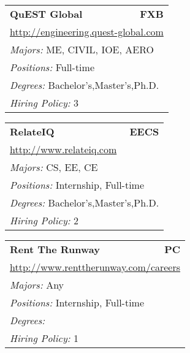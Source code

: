 \documentclass[twoside]{article}
\begin{document}
\begin{center}
\begin{multicols}{3}
\begin{FlushLeft}
\begin{minipage}{.9\columnwidth}
\end{minipage}
 
\begin{minipage}{.9\columnwidth}\begin{tabularx}{.95\columnwidth}{Xr}
                 {\Large\bf QuEST Global} & {\Large\bf FXB}\\
    \multicolumn{2}{p{.95\columnwidth}}{\url{http://engineering.quest-global.com}}\\
    \multicolumn{2}{p{.95\columnwidth}}{\emph{Majors:} ME, CIVIL, IOE, AERO}\\
    \multicolumn{2}{p{.95\columnwidth}}{\emph{Positions:} Full-time}\\
    \multicolumn{2}{p{.95\columnwidth}}{\emph{Degrees:} Bachelor's,Master's,Ph.D.}\\
    \multicolumn{2}{p{.95\columnwidth}}{\emph{Hiring Policy:} 3}\\
    \end{tabularx}
    
\end{minipage}
 
\begin{minipage}{.9\columnwidth}\begin{tabularx}{.95\columnwidth}{Xr}
                 {\Large\bf RelateIQ} & {\Large\bf EECS}\\
    \multicolumn{2}{p{.95\columnwidth}}{\url{http://www.relateiq.com}}\\
    \multicolumn{2}{p{.95\columnwidth}}{\emph{Majors:} CS, EE, CE}\\
    \multicolumn{2}{p{.95\columnwidth}}{\emph{Positions:} Internship, Full-time}\\
    \multicolumn{2}{p{.95\columnwidth}}{\emph{Degrees:} Bachelor's,Master's,Ph.D.}\\
    \multicolumn{2}{p{.95\columnwidth}}{\emph{Hiring Policy:} 2}\\
    \end{tabularx}
    
\end{minipage}
 
\begin{minipage}{.9\columnwidth}\begin{tabularx}{.95\columnwidth}{Xr}
                 {\Large\bf Rent The Runway} & {\Large\bf PC}\\
    \multicolumn{2}{p{.95\columnwidth}}{\url{http://www.renttherunway.com/careers}}\\
    \multicolumn{2}{p{.95\columnwidth}}{\emph{Majors:} Any}\\
    \multicolumn{2}{p{.95\columnwidth}}{\emph{Positions:} Internship, Full-time}\\
    \multicolumn{2}{p{.95\columnwidth}}{\emph{Degrees:} }\\
    \multicolumn{2}{p{.95\columnwidth}}{\emph{Hiring Policy:} 1}\\
    \end{tabularx}
    

\end{minipage}
\end{FlushLeft}
\end{multicols}
\end{center}
\end{document}
